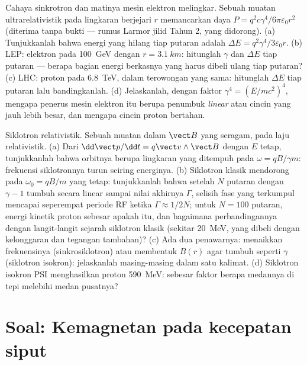 \begin{exercise}[$\star\star\star$]\label{exo:b3:covariant-electromagnetism:11}
Cahaya sinkrotron dan matinya mesin elektron melingkar. Sebuah muatan
ultrarelativistik pada lingkaran berjejari $r$ memancarkan daya
$P = q^2c\gamma^4/6\pi\varepsilon_0r^2$ (diterima tanpa bukti --- rumus
Larmor jilid Tahun 2, yang didorong). (a) Tunjukkanlah bahwa energi yang
hilang tiap putaran adalah $\Delta E = q^2\gamma^4/3\varepsilon_0r$. (b) LEP:
elektron pada \qty{100}{GeV} dengan $r = \qty{3.1}{km}$: hitunglah $\gamma$ dan
$\Delta E$ tiap putaran --- berapa bagian energi berkasnya yang harus
dibeli ulang tiap putaran? (c) LHC: proton pada \qty{6.8}{TeV}, dalam
terowongan yang sama: hitunglah $\Delta E$ tiap putaran lalu
bandingkanlah. (d) Jelaskanlah, dengan faktor $\gamma^4 =
(E/mc^2)^4$, mengapa penerus mesin elektron itu berupa penumbuk
\emph{linear} atau cincin yang jauh lebih besar, dan mengapa cincin
proton bertahan.
\end{exercise}

\begin{exercise}[$\star\star\star$]\label{exo:b3:covariant-electromagnetism:12}
Siklotron relativistik. Sebuah muatan dalam $\vect B$ yang seragam, pada
laju relativistik. (a) Dari $\dd\vect p/\dd t = q\vect v\wedge\vect
B$ dengan $E$ tetap, tunjukkanlah bahwa orbitnya berupa lingkaran yang
ditempuh pada $\omega = qB/\gamma m$: frekuensi siklotronnya turun
seiring energinya.
(b) Siklotron klasik mendorong pada $\omega_0 = qB/m$ yang tetap:
tunjukkanlah bahwa setelah $N$ putaran dengan $\gamma - 1$ tumbuh secara
linear sampai nilai akhirnya $\Gamma$, selisih fase yang terkumpul
mencapai seperempat periode RF ketika $\Gamma \approx 1/2N$; untuk
$N = 100$ putaran, energi kinetik proton sebesar apakah itu, dan
bagaimana perbandingannya dengan langit-langit sejarah siklotron klasik
(sekitar \qty{20}{MeV}, yang dibeli dengan kelonggaran dan tegangan
tambahan)? (c) Ada dua
penawarnya: menaikkan frekuensinya (sinkrosiklotron) atau membentuk
$B(r)$ agar tumbuh seperti $\gamma$ (siklotron isokron): jelaskanlah
masing-masing dalam satu kalimat. (d) Siklotron isokron PSI
menghasilkan proton \qty{590}{MeV}: sebesar faktor berapa medannya di
tepi melebihi medan pusatnya?
\end{exercise}

\section{Soal: Kemagnetan pada kecepatan siput}

